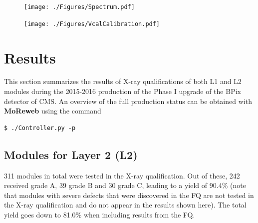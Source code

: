 \documentclass[a4paper,12pt,twoside]{article}
\begin{document}
\begin{figure} [h!]
\centering
\begin{minipage}[t]{.48\textwidth}
  \centering
  \texttt{[image: ./Figures/Spectrum.pdf]}
  \label{Spectrum}
\end{minipage}%
\hspace{2mm}
\begin{minipage}[t]{.48\textwidth}
  \centering
  \texttt{[image: ./Figures/VcalCalibration.pdf]}
  \label{VcalCalibration}
\end{minipage}
\end{figure}

\section{Results}

This section summarizes the results of X-ray qualifications of both L1 and L2 modules during the 2015-2016 production of the Phase I upgrade of the BPix detector of CMS. An overview of the full production status can be obtained with \textbf{MoReweb} using the command 
\begin{verbatim}
$ ./Controller.py -p
\end{verbatim}

\subsection{Modules for Layer 2 (L2)}
311 modules in total were tested in the X-ray qualification. Out of these, 242 received grade A, 39 grade B and 30 grade C, leading to a yield of 90.4\% (note that modules with severe defects that were discovered in the FQ are not tested in the X-ray qualification and do not appear in the results shown here). The total yield goes down to 81.0\% when including results from the FQ.  
\end{document}
